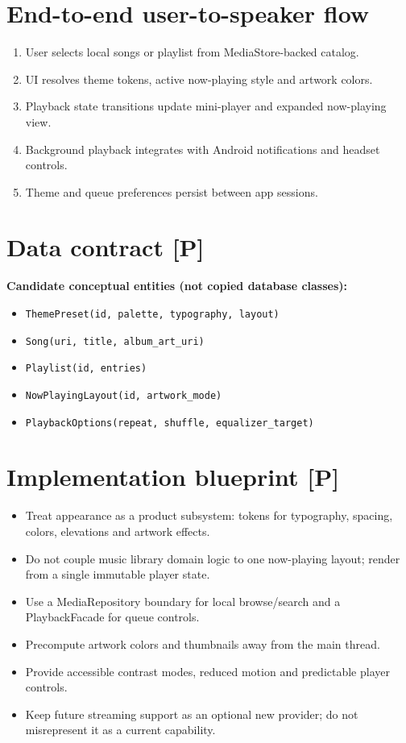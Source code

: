 \documentclass[10pt,a4paper,oneside]{report}
\begin{document}
\section{End-to-end user-to-speaker flow}
\begin{enumerate}[leftmargin=*,itemsep=2pt,topsep=2pt]
\item User selects local songs or playlist from MediaStore-backed catalog.
\item UI resolves theme tokens, active now-playing style and artwork colors.
\item Playback state transitions update mini-player and expanded now-playing view.
\item Background playback integrates with Android notifications and headset controls.
\item Theme and queue preferences persist between app sessions.
\end{enumerate}
\section{Data contract [P]}
\begin{evidencebox}\small\textbf{Candidate conceptual entities (not copied database classes):}\par
\begin{itemize}[leftmargin=*,itemsep=1pt,topsep=2pt]
\item \texttt{ThemePreset(id, palette, typography, layout)}
\item \texttt{Song(uri, title, album\_art\_uri)}
\item \texttt{Playlist(id, entries)}
\item \texttt{NowPlayingLayout(id, artwork\_mode)}
\item \texttt{PlaybackOptions(repeat, shuffle, equalizer\_target)}
\end{itemize}\end{evidencebox}
\section{Implementation blueprint [P]}
\begin{itemize}[leftmargin=*,itemsep=2pt,topsep=3pt]
\item Treat appearance as a product subsystem: tokens for typography, spacing, colors, elevations and artwork effects.
\item Do not couple music library domain logic to one now-playing layout; render from a single immutable player state.
\item Use a MediaRepository boundary for local browse/search and a PlaybackFacade for queue controls.
\item Precompute artwork colors and thumbnails away from the main thread.
\item Provide accessible contrast modes, reduced motion and predictable player controls.
\item Keep future streaming support as an optional new provider; do not misrepresent it as a current capability.
\end{itemize}
\end{document}
